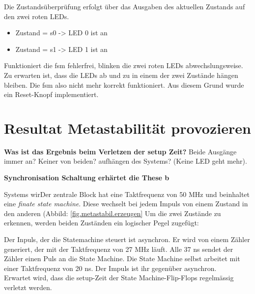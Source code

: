 Die Zustandsüberprüfung erfolgt über das Ausgaben des aktuellen Zustands auf den zwei roten LEDs. 
\begin{itemize}
	\item Zustand = s0
		  -> LED 0 ist an
	\item Zustand = s1
		  -> LED 1 ist an
\end{itemize}
Funktioniert die fsm fehlerfrei, blinken die zwei roten LEDs abwechslungsweise. Zu erwarten ist, dass die LEDs ab und zu in einem der zwei Zustände hängen bleiben. Die fsm also nicht mehr korrekt funktioniert.
Aus diesem Grund wurde ein Reset-Knopf implementiert.







\section{Resultat Metastabilität provozieren}\label{sect.meatastabil_proozieren}




\textbf{Was ist das Ergebnis beim Verletzen der setup Zeit?}
Beide Ausgänge immer an?
Keiner von beiden?
aufhängen des Systems? (Keine LED geht mehr).

\textbf{Synchronisation Schaltung erhärtet die These b\\}




Systems wirDer zentrale Block hat eine Taktfrequenz von 50 MHz und beinhaltet eine \textit{finate state machine}. Diese wechselt bei jedem Impuls von einem Zustand in den anderen (Abbild: \ref{fig.metastabil.erzeugen} Um die zwei Zustände zu erkennen, werden beiden Zuständen ein logischer Pegel zugefügt:\\
\newline



Der Inpuls, der die Statemachine steuert ist asynchron. Er wird von einem Zähler generiert, der mit der Taktfrequenz von 27 MHz läuft. Alle 37 ns sendet der Zähler einen Puls an die State Machine. Die State Machine selbst arbeitet mit einer Taktfrequenz von 20 ns. Der Impuls ist ihr gegenüber asynchron.\\
\newline
Erwartet wird, dass die setup-Zeit der State Machine-Flip-Flops regelmässig verletzt werden. \\


